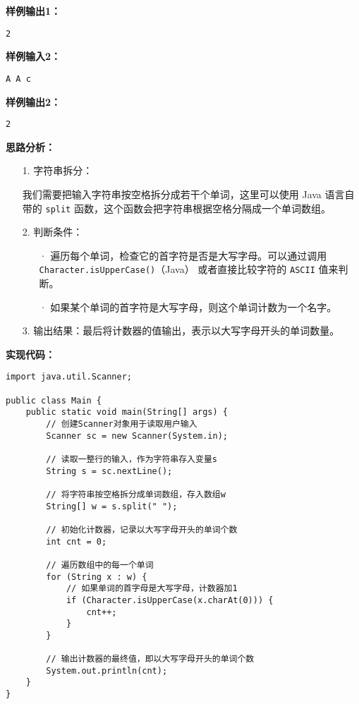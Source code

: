 \documentclass[a4paper]{ctexart}
\begin{document}
\noindent\textbf{样例输出1：}
\lstset{numbers=none}
\begin{lstlisting}
2	
\end{lstlisting}
\lstset{numbers=left}

\noindent\textbf{样例输入2：}
\lstset{numbers=none}
\begin{lstlisting}
A A c
\end{lstlisting}
\lstset{numbers=left}

\noindent\textbf{样例输出2：}
\lstset{numbers=none}
\begin{lstlisting}
2	
\end{lstlisting}
\lstset{numbers=left}

\vspace{10pt}

\noindent\textbf{思路分析：}
\begin{itemize}
	\item[1.] 字符串拆分：
	
	我们需要把输入字符串按空格拆分成若干个单词，这里可以使用 Java 语言自带的 \texttt{split} 函数，这个函数会把字符串根据空格分隔成一个单词数组。
	
	\item[2.] 判断条件：
	
	\begin{itemize}
	\item[·] 遍历每个单词，检查它的首字符是否是大写字母。可以通过调用\texttt{Character.isUpperCase()}（Java） 或者直接比较字符的 \texttt{ASCII} 值来判断。
	
	\item[·] 如果某个单词的首字符是大写字母，则这个单词计数为一个名字。
	\end{itemize}
	
	\item[3.] 输出结果：最后将计数器的值输出，表示以大写字母开头的单词数量。
\end{itemize}

\noindent\textbf{实现代码：}

\begin{lstlisting}
import java.util.Scanner;

public class Main {
	public static void main(String[] args) {
		// 创建Scanner对象用于读取用户输入
		Scanner sc = new Scanner(System.in);
		
		// 读取一整行的输入，作为字符串存入变量s
		String s = sc.nextLine();
		
		// 将字符串按空格拆分成单词数组，存入数组w
		String[] w = s.split(" ");
		
		// 初始化计数器，记录以大写字母开头的单词个数
		int cnt = 0;
		
		// 遍历数组中的每一个单词
		for (String x : w) {
			// 如果单词的首字母是大写字母，计数器加1
			if (Character.isUpperCase(x.charAt(0))) {
				cnt++;
			}
		}
		
		// 输出计数器的最终值，即以大写字母开头的单词个数
		System.out.println(cnt);
	}
}

\end{lstlisting}
	
\end{document}
